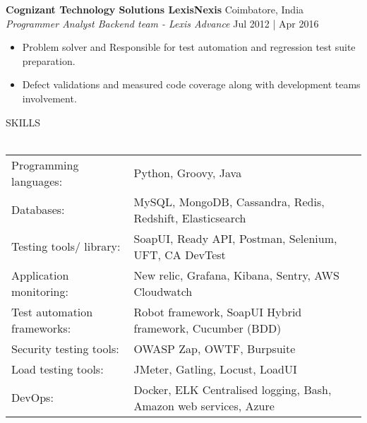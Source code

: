 \documentclass[a4paper]{article}
\newcommand{\lineunder} {
    \vspace*{-8pt} \\
    \hspace*{-18pt} \hrulefill \\
}
\newcommand{\header} [1] {
    {\hspace*{-18pt}\vspace*{6pt} \textsc{#1}}
    \vspace*{-6pt} \lineunder
}
\begin{document}
\textbf{Cognizant Technology Solutions \textbar{} LexisNexis} \hfill Coimbatore, India\\
\textit{Programmer Analyst \textbar{} Backend team - Lexis Advance} \hfill Jul 2012 | Apr 2016\\
\vspace{-1mm}
\begin{itemize} \itemsep 1pt
	\item Problem solver and Responsible for test automation and regression test suite preparation.
	\item Defect validations and measured code coverage along with development teams involvement.
\end{itemize}

\header{SKILLS}
\begin{tabular}{ l l }
	Programming languages:      & Python, Groovy, Java                                              \\
	Databases:                  & MySQL, MongoDB, Cassandra, Redis, Redshift, Elasticsearch         \\
	Testing tools/ library:     & SoapUI, Ready API, Postman, Selenium, UFT, CA DevTest             \\
	Application monitoring:     & New relic, Grafana, Kibana, Sentry, AWS Cloudwatch                \\
	Test automation frameworks: & Robot framework, SoapUI Hybrid framework, Cucumber (BDD)          \\
	Security testing tools:     & OWASP Zap, OWTF, Burpsuite                                        \\
	Load testing tools:         & JMeter, Gatling, Locust, LoadUI                                   \\
	DevOps:                     & Docker, ELK Centralised logging, Bash, Amazon web services, Azure \\
\end{tabular}
\vspace{2mm}
\end{document}
